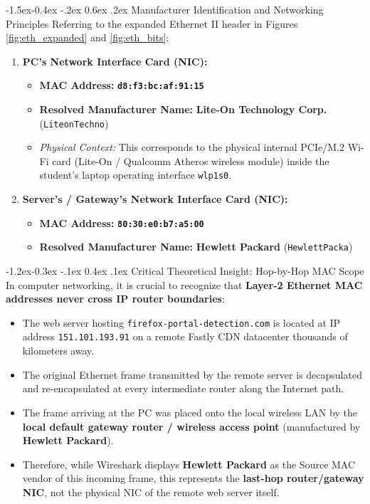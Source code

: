 \documentclass[11pt,a4paper]{article}
\makeatletter
\renewcommand\subsection{\@startsection{subsection}{2}{\z@}%
  {-1.5ex\@plus -0.4ex \@minus -.2ex}%
  {0.6ex \@plus .2ex}%
  {\normalfont\large\bfseries}}
\renewcommand\subsubsection{\@startsection{subsubsection}{3}{\z@}%
  {-1.2ex\@plus -0.3ex \@minus -.1ex}%
  {0.4ex \@plus .1ex}%
  {\normalfont\normalsize\bfseries}}
\makeatother
\begin{document}
\subsection{Manufacturer Identification and Networking Principles}
Referring to the expanded Ethernet II header in Figures \ref{fig:eth_expanded} and \ref{fig:eth_bits}:
\begin{enumerate}
  \item \textbf{PC's Network Interface Card (NIC):}
  \begin{itemize}
    \item \textbf{MAC Address:} \textbf{\texttt{d8:f3:bc:af:91:15}}
    \item \textbf{Resolved Manufacturer Name:} \textbf{Lite-On Technology Corp.} (\texttt{LiteonTechno})
    \item \textit{Physical Context:} This corresponds to the physical internal PCIe/M.2 Wi-Fi card (Lite-On / Qualcomm Atheros wireless module) inside the student's laptop operating interface \texttt{wlp1s0}.
  \end{itemize}
  \item \textbf{Server's / Gateway's Network Interface Card (NIC):}
  \begin{itemize}
    \item \textbf{MAC Address:} \textbf{\texttt{80:30:e0:b7:a5:00}}
    \item \textbf{Resolved Manufacturer Name:} \textbf{Hewlett Packard} (\texttt{HewlettPacka})
  \end{itemize}
\end{enumerate}

\subsubsection{Critical Theoretical Insight: Hop-by-Hop MAC Scope}
In computer networking, it is crucial to recognize that \textbf{Layer-2 Ethernet MAC addresses never cross IP router boundaries}:
\begin{itemize}
  \item The web server hosting \texttt{firefox-portal-detection.com} is located at IP address \texttt{151.101.193.91} on a remote Fastly CDN datacenter thousands of kilometers away.
  \item The original Ethernet frame transmitted by the remote server is decapsulated and re-encapsulated at every intermediate router along the Internet path.
  \item The frame arriving at the PC was placed onto the local wireless LAN by the \textbf{local default gateway router / wireless access point} (manufactured by \textbf{Hewlett Packard}).
  \item Therefore, while Wireshark displays \textbf{Hewlett Packard} as the Source MAC vendor of this incoming frame, this represents the \textbf{last-hop router/gateway NIC}, not the physical NIC of the remote web server itself.
\end{itemize}
\end{document}
